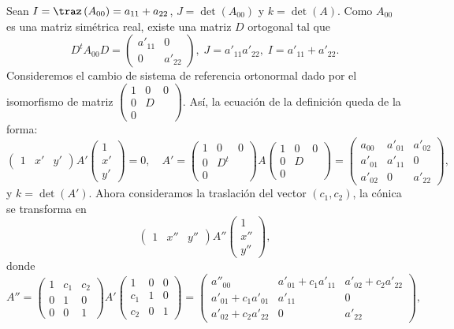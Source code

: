 Sean $\displaystyle I = \traz\left(A_{00}\right) = a_{11} + a_{22} $, $\displaystyle J = \det\left(A_{00}\right) $ y $\displaystyle k = \det\left(A\right) $. Como $\displaystyle A_{00} $ es una matriz simétrica real, existe una matriz $\displaystyle D $ ortogonal tal que 
	\[D^{t} A_{00}D = \begin{pmatrix} a'_{11} & 0 \\ 0 & a'_{22} \end{pmatrix}, \; J = a'_{11}a'_{22}, \; I = a'_{11} + a'_{22} .\]
	Consideremos el cambio de sistema de referencia ortonormal dado por el isomorfismo de matriz $\displaystyle \begin{pmatrix} 1 & 0 & 0 \\
		0 & D & \\
0 & & \end{pmatrix} $. Así, la ecuación de la definición queda de la forma:
		\[\begin{pmatrix} 1 & x' & y' \end{pmatrix}A'\begin{pmatrix} 1 \\ x' \\ y' \end{pmatrix} = 0, \quad A' = \begin{pmatrix} 1 & 0 & 0 \\
		0 & D^{t} & \\
0 & & \end{pmatrix}A\begin{pmatrix} 1 & 0 & 0 \\
		0 & D & \\
		0 & & \end{pmatrix} = \begin{pmatrix} a_{00} & a'_{01} & a'_{02} \\
	a'_{01} & a'_{11} & 0 \\
a'_{02} & 0 & a'_{22}\end{pmatrix} ,\]
y $\displaystyle k = \det\left(A'\right) $. Ahora consideramos la traslación del vector $\displaystyle \left(c_{1}, c_{2}\right) $, la cónica se transforma en 
\[ \begin{pmatrix} 1 & x'' & y'' \end{pmatrix}A''\begin{pmatrix} 1 \\ x'' \\ y '' \end{pmatrix} ,\]
donde 
\[ A'' = \begin{pmatrix} 1 & c_{1} & c_{2} \\
0 & 1 & 0 \\
0 & 0 & 1\end{pmatrix}A'\begin{pmatrix} 1 & 0 & 0\\
c_{1} & 1 & 0 \\
c_{2} & 0 & 1\end{pmatrix} = \begin{pmatrix} a''_{00} & a'_{01} +c_{1}a'_{11} & a'_{02}+c_{2}a'_{22} \\
a'_{01}+c_{1}a'_{01} & a'_{11} & 0 \\
a'_{02} +c_{2}a'_{22} & 0 & a'_{22}\end{pmatrix} ,\]
